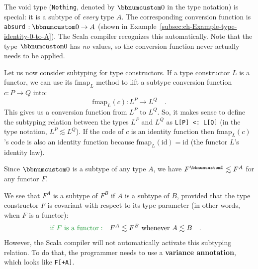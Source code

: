 The void type (\lstinline!Nothing!, denoted by $\bbnum 0$ in the
type notation) is special: it is a subtype of \emph{every}
type $A$. The corresponding conversion function is \lstinline!absurd!
$:\bbnum 0\rightarrow A$ (shown in Example~\ref{subsec:ch-Example-type-identity-0-to-A}).
The Scala compiler recognizes this automatically. Note that the type
$\bbnum 0$ has \emph{no} values, so the conversion function never
actually needs to be applied. 

Let us now consider subtyping for type constructors. If a type constructor
$L$ is a functor, we can use its $\text{fmap}_{L}$ method to lift
a subtype conversion function $c:P\rightarrow Q$ into:
\[
\text{fmap}_{L}(c):L^{P}\rightarrow L^{Q}\quad.
\]
This gives us a conversion function from $L^{P}$ to $L^{Q}$. So,
it makes sense to define the subtyping relation between the types
$L^{P}$ and $L^{Q}$ as \lstinline!L[P] <: L[Q]! (in the type notation,
$L^{P}\lesssim L^{Q}$). If the code of $c$ is an identity  function
then $\text{fmap}_{L}(c)$\textsf{'}s code is also an identity function because
$\text{fmap}_{L}(\text{id})=\text{id}$ (the functor $L$\textsf{'}s identity
law).

Since $\bbnum 0$ is a subtype of any type $A$, we have $F^{\bbnum 0}\lesssim F^{A}$
for any functor $F$.

We see that $F^{A}$ is a subtype
of $F^{B}$ if $A$ is a subtype of $B$, provided that the type constructor
$F$ is covariant with respect to its type parameter (in other words,
when $F$ is a functor):
\begin{align*}
{\color{greenunder}\text{if }F\text{ is a functor}:}\quad & F^{A}\lesssim F^{B}\text{ whenever }A\lesssim B\quad.
\end{align*}
However, the Scala compiler will not automatically activate this subtyping
relation. To do that, the programmer needs to use a \textbf{variance
annotation}, which looks like \lstinline!F[+A]!.

